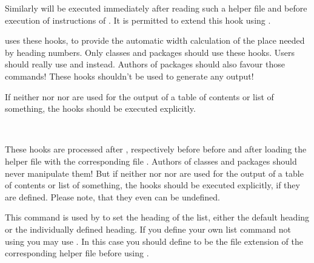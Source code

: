 Similarly  will be executed immediately after
reading such a helper file and before execution of instructions of
. It is permitted to extend this hook using
.

\KOMAScript{} uses these hooks, to provide the automatic width calculation of
the place needed by heading numbers. Only classes and packages should use
these hooks. Users should really use
 and  instead. Authors of
packages should also favour those commands! These hooks shouldn't be used to
generate any output!

If neither  nor 
nor  are used for the output of a table of contents or list
of something, the hooks should be executed explicitly.%
%
%

\begin{Declaration}
  \\
\end{Declaration}
%
%
These hooks are processed after , respectively
before  before and after loading the helper file
with the corresponding file . Authors
of classes and packages should never manipulate them! But if
neither  nor  nor
 are used for the output of a table of contents or list of
something, the hooks should be executed explicitly, if they are
defined. Please note, that they even can be undefined.%
%
%

\begin{Declaration}
\end{Declaration}
%
This command
is used by  to set the heading of the list, either the
default heading or the individually defined heading. If you define your own
list command not using  you may use
. In this case you should define
 to be the file
extension of the corresponding helper file before using
.
%

